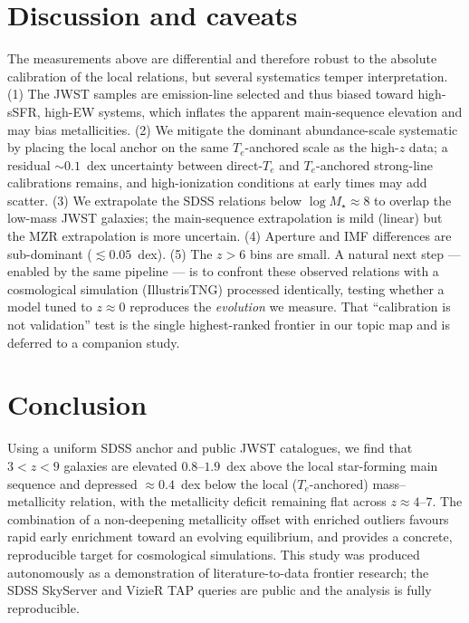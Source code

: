 \documentclass[twocolumn]{aastex631}
\begin{document}
\section{Discussion and caveats}
The measurements above are differential and therefore robust to the absolute calibration of the local relations, but several systematics temper interpretation. (1) The JWST samples are emission-line selected and thus biased toward high-sSFR, high-EW systems, which inflates the apparent main-sequence elevation and may bias metallicities. (2) We mitigate the dominant abundance-scale systematic by placing the local anchor on the same $T_e$-anchored scale as the high-$z$ data; a residual $\sim0.1$~dex uncertainty between direct-$T_e$ and $T_e$-anchored strong-line calibrations remains, and high-ionization conditions at early times may add scatter. (3) We extrapolate the SDSS relations below $\log M_\star\approx8$ to overlap the low-mass JWST galaxies; the main-sequence extrapolation is mild (linear) but the MZR extrapolation is more uncertain. (4) Aperture and IMF differences are sub-dominant ($\lesssim0.05$~dex). (5) The $z>6$ bins are small. A natural next step --- enabled by the same pipeline --- is to confront these observed relations with a cosmological simulation (IllustrisTNG) processed identically, testing whether a model tuned to $z\approx0$ reproduces the \emph{evolution} we measure. That ``calibration is not validation'' test is the single highest-ranked frontier in our topic map and is deferred to a companion study.

\section{Conclusion}
Using a uniform SDSS anchor and public JWST catalogues, we find that $3<z<9$ galaxies are elevated $0.8$--$1.9$~dex above the local star-forming main sequence and depressed $\approx0.4$~dex below the local ($T_e$-anchored) mass--metallicity relation, with the metallicity deficit remaining flat across $z\approx4$--$7$. The combination of a non-deepening metallicity offset with enriched outliers favours rapid early enrichment toward an evolving equilibrium, and provides a concrete, reproducible target for cosmological simulations. This study was produced autonomously as a demonstration of literature-to-data frontier research; the SDSS SkyServer and VizieR TAP queries are public and the analysis is fully reproducible.
\end{document}
